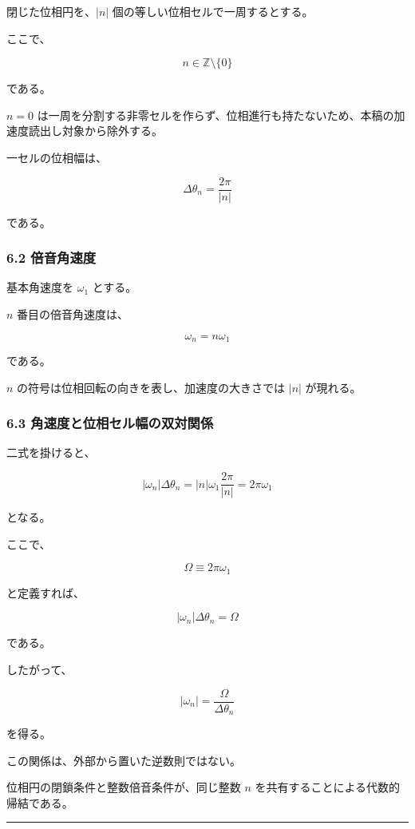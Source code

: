 \documentclass[
  a4paper,
]{ltjsarticle}
\begin{document}
閉じた位相円を、\(|n|\) 個の等しい位相セルで一周するとする。

ここで、

\[
n\in\mathbb Z\setminus\{0\}
\]

である。

\(n=0\)
は一周を分割する非零セルを作らず、位相進行も持たないため、本稿の加速度読出し対象から除外する。

一セルの位相幅は、

\[
\boxed{
\Delta\theta_n
=\frac{2\pi}{|n|}
}
\]

である。

\subsubsection{6.2 倍音角速度}\label{ux500dux97f3ux89d2ux901fux5ea6}

基本角速度を \(\omega_1\) とする。

\(n\) 番目の倍音角速度は、

\[
\boxed{
\omega_n=n\omega_1
}
\]

である。

\(n\) の符号は位相回転の向きを表し、加速度の大きさでは \(|n|\)
が現れる。

\subsubsection{6.3
角速度と位相セル幅の双対関係}\label{ux89d2ux901fux5ea6ux3068ux4f4dux76f8ux30bbux30ebux5e45ux306eux53ccux5bfeux95a2ux4fc2}

二式を掛けると、

\[
|\omega_n|\Delta\theta_n
=|n|\omega_1\frac{2\pi}{|n|}
=2\pi\omega_1
\]

となる。

ここで、

\[
\Omega\equiv2\pi\omega_1
\]

と定義すれば、

\[
\boxed{
|\omega_n|\Delta\theta_n=\Omega
}
\]

である。

したがって、

\[
\boxed{
|\omega_n|
=\frac{\Omega}{\Delta\theta_n}
}
\]

を得る。

この関係は、外部から置いた逆数則ではない。

位相円の閉鎖条件と整数倍音条件が、同じ整数 \(n\)
を共有することによる代数的帰結である。

\begin{center}\rule{0.5\linewidth}{0.5pt}\end{center}
\end{document}

